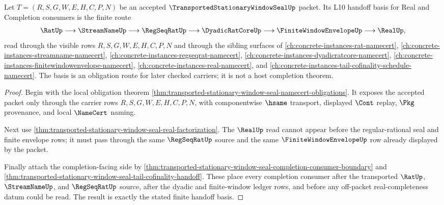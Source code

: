 \begin{theorem}
\label{thm:transported-stationary-window-seal-l10-handoff-obligation-basis}
Let $T=(R,S,G,W,E,H,C,P,N)$ be an accepted $\TransportedStationaryWindowSealUp$ packet. Its L10 handoff basis for Real and Completion consumers is the finite route
$$
\begin{aligned}
  \RatUp
  \longrightarrow
  \StreamNameUp
  \longrightarrow
  \RegSeqRatUp
  \longrightarrow
  \DyadicRatCoreUp
  \longrightarrow
  \FiniteWindowEnvelopeUp
  \longrightarrow
  \RealUp ,
\end{aligned}
$$
read through the visible rows $R,S,G,W,E,H,C,P,N$ and through the sibling surfaces of \autoref{ch:concrete-instances-rat-namecert}, \autoref{ch:concrete-instances-streamname-namecert}, \autoref{ch:concrete-instances-regseqrat-namecert}, \autoref{ch:concrete-instances-dyadicratcore-namecert}, \autoref{ch:concrete-instances-finitewindowenvelope-namecert}, \autoref{ch:concrete-instances-real-namecert}, and \autoref{ch:concrete-instances-tail-cofinality-schedule-namecert}. The basis is an obligation route for later checked carriers; it is not a host completion theorem.
\end{theorem}
\begin{proof}
Begin with the local obligation theorem \autoref{thm:transported-stationary-window-seal-namecert-obligations}. It exposes the accepted packet only through the carrier rows $R,S,G,W,E,H,C,P,N$, with componentwise $\hsame$ transport, displayed $\Cont$ replay, $\Pkg$ provenance, and local $\NameCert$ naming.

Next use \autoref{thm:transported-stationary-window-seal-real-factorization}. The $\RealUp$ read cannot appear before the regular-rational seal and finite envelope rows; it must pass through the same $\RegSeqRatUp$ source and the same $\FiniteWindowEnvelopeUp$ row already displayed by the packet.

Finally attach the completion-facing side by \autoref{thm:transported-stationary-window-seal-completion-consumer-boundary} and \autoref{thm:transported-stationary-window-seal-tail-cofinality-handoff}. These place every completion consumer after the transported $\RatUp$, $\StreamNameUp$, and $\RegSeqRatUp$ source, after the dyadic and finite-window ledger rows, and before any off-packet real-completeness datum could be read. The result is exactly the stated finite handoff basis.
\end{proof}

